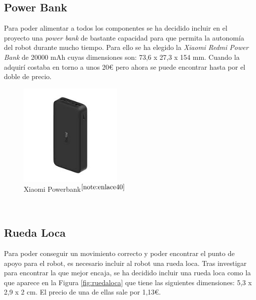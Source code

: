 \setcounter{footnote}{39} %

\subsection{Power Bank}

Para poder alimentar a todos los componentes se ha decidido incluir en el proyecto una \textit{power bank} de bastante capacidad para que permita la autonomía del robot durante mucho tiempo. Para ello se ha elegido la \textit{Xiaomi Redmi Power Bank} de 20000 mAh cuyas dimensiones son: 73,6 x 27,3 x 154 mm. Cuando la adquirí costaba en torno a unos 20€ pero ahora se puede encontrar hasta por el doble de precio. 

\begin{figure} [h!]
	\begin{center}
		\includegraphics[width=5cm]{figs/powerbank.png}
	\end{center}
	\caption{Xiaomi Powerbank$^{\ref{note:enlace40}}$} 
	\label{fig:powerbank}
\end{figure}\

\setcounter{footnote}{40} %

\subsection{Rueda Loca}

Para poder conseguir un movimiento correcto y poder encontrar el punto de apoyo para el robot, es necesario incluir al robot una rueda loca. Tras investigar para encontrar la que mejor encaja, se ha decidido incluir una rueda loca como la que aparece en la Figura \ref{fig:ruedaloca} que tiene las siguientes dimensiones: 5,3 x 2,9 x 2 cm. El precio de una de ellas sale por 1,13€.

